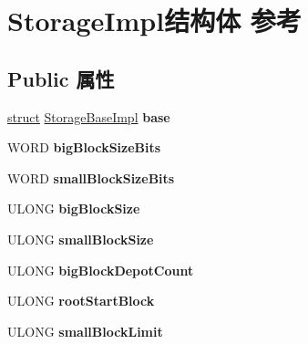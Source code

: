 \hypertarget{struct_storage_impl}{}\section{Storage\+Impl结构体 参考}
\label{struct_storage_impl}
\subsection*{Public 属性}
\begin{DoxyCompactItemize}
\item 
\mbox{\label{struct_storage_impl_a748dbedc35463460191fc65ec69750d4}} 
\hyperlink{interfacestruct}{struct} \hyperlink{struct_storage_base_impl}{Storage\+Base\+Impl} {\bfseries base}
\item 
\mbox{\label{struct_storage_impl_a4b9f2f7b48652b167d115d9e62946d5b}} 
W\+O\+RD {\bfseries big\+Block\+Size\+Bits}
\item 
\mbox{\label{struct_storage_impl_a58cd2f2b09f2889e475fae62f70f1a2f}} 
W\+O\+RD {\bfseries small\+Block\+Size\+Bits}
\item 
\mbox{\label{struct_storage_impl_a7d78de48a8084739dbb61e4b8b9e3d73}} 
U\+L\+O\+NG {\bfseries big\+Block\+Size}
\item 
\mbox{\label{struct_storage_impl_af0d4f1d84e012044383fbc6474796c2f}} 
U\+L\+O\+NG {\bfseries small\+Block\+Size}
\item 
\mbox{\label{struct_storage_impl_a99b5dbb48f04e5f78e0aeb8e08ac8e50}} 
U\+L\+O\+NG {\bfseries big\+Block\+Depot\+Count}
\item 
\mbox{\label{struct_storage_impl_a619b5dedfeb48ed763ac6009b906b0fa}} 
U\+L\+O\+NG {\bfseries root\+Start\+Block}
\item 
\mbox{\label{struct_storage_impl_a56a225773dc90044c2ebeef27df1b4f3}} 
U\+L\+O\+NG {\bfseries small\+Block\+Limit}
\item 
\mbox{\label{struct_storage_impl_a4fce6e1877c4c8124884d6c79d4b9e09}} 

\end{DoxyCompactItemize}
